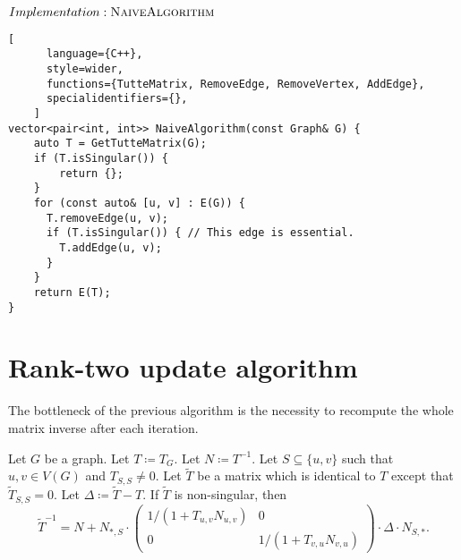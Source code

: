 \begin{programruledcaption}{\(Implementation: \textsc{NaiveAlgorithm}\)}
    \begin{lstlisting}[
      language={C++},
      style=wider,
      functions={TutteMatrix, RemoveEdge, RemoveVertex, AddEdge},
      specialidentifiers={},
    ]
vector<pair<int, int>> NaiveAlgorithm(const Graph& G) {
    auto T = GetTutteMatrix(G);
    if (T.isSingular()) {
        return {};
    }
    for (const auto& [u, v] : E(G)) {
      T.removeEdge(u, v);
      if (T.isSingular()) { // This edge is essential.
        T.addEdge(u, v);
      }
    }
    return E(T);
}
    \end{lstlisting}
\end{programruledcaption}

\section{Rank-two update algorithm}

The bottleneck of the previous algorithm is the necessity to recompute the whole matrix inverse after each iteration.

\begin{theorem}
\label{thm:rank-two}
    Let \(G\) be a graph. 
    Let \(T \coloneqq T_G\). 
    Let \(N \coloneqq T^{-1}\).
    Let \(S \subseteq \{u, v\}\) such that \(u, v \in V(G)\) and \(T_{S, S} \neq 0\).
    Let \(\tilde{T}\) be a matrix which is identical to \(T\) except that \(\tilde{T}_{S, S} = 0\).
    Let \(\Delta \coloneqq \tilde{T} - T\).
    If \(\tilde{T}\) is non-singular, then
    \[
        \tilde{T}^{-1} = N + N_{*, S} \cdot 
        \begin{pmatrix}
            1 / (1 + T_{u, v}N_{u, v}) & 0 \\
            0 &  1 / (1 + T_{v, u}N_{v, u})
        \end{pmatrix}
        \cdot \Delta \cdot N_{S, *}.
    \]
\end{theorem}

